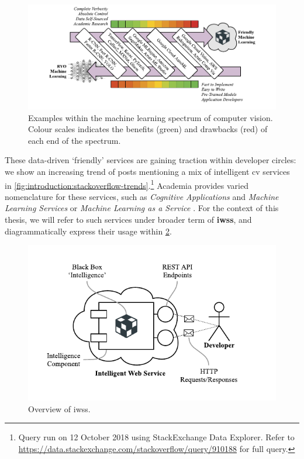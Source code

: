 \begin{figure}
\centering
\caption[The spectrum of machine learning]{Examples within the machine learning spectrum of computer vision. Colour scales indicates the benefits (green) and drawbacks (red) of each end of the spectrum.}
\label{fig:introduction:cv-spectrum}
\includegraphics[width=\linewidth]{cv-spectrum}
\end{figure}



These data-driven `friendly' services are gaining traction within developer circles: we show an increasing trend of  posts mentioning a mix of intelligent \gls{cv} services in \cref{fig:introduction:stackoverflow-trends}.\footnote{Query run on 12 October 2018 using StackExchange Data Explorer. Refer to \url{https://data.stackexchange.com/stackoverflow/query/910188} for full query.}
Academia provides varied nomenclature for these services, such as \textit{Cognitive Applications} and \textit{Machine Learning Services} \citep{Hwang:2017tr} or \textit{Machine Learning as a Service} \citep{Ribeiro:2015dz}. 
For the context of this thesis, we will refer to such services under broader term of \textbf{\glspl{iws}}, and diagrammatically express their usage within \cref{fig:introduction:cloud-intelliegnce-service}.

\begin{figure}[h!]
\centering
\caption[Overview of intelligent web services]{Overview of \glspl{iws}.}
\label{fig:introduction:cloud-intelliegnce-service}
\includegraphics{cloud-intelliegnce-service}
\end{figure}


